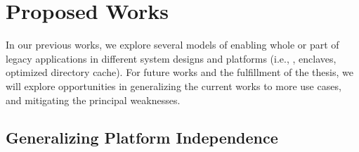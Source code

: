 \chapter{Proposed Works}
\label{chap:future}



In our previous works, we explore several models of enabling
whole or part of legacy applications
in different system designs and platforms
(i.e., \liboses{}, \sgx{} enclaves, optimized directory cache).
For future works and the fulfillment of the thesis,
we will explore
opportunities in generalizing the current works to more use cases,
and mitigating the principal weaknesses.




\section{Generalizing Platform Independence}
\label{sec:future:independence}

